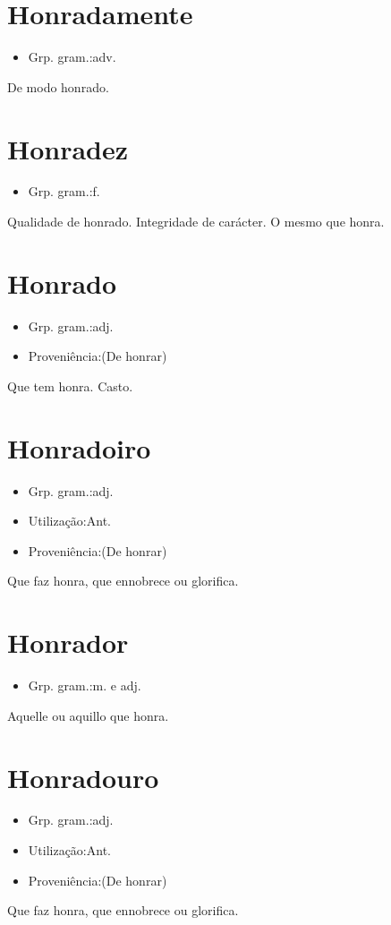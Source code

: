 \documentclass{article}
\begin{document}
\section{Honradamente}
\begin{itemize}
\item {Grp. gram.:adv.}
\end{itemize}
De modo honrado.
\section{Honradez}
\begin{itemize}
\item {Grp. gram.:f.}
\end{itemize}
Qualidade de honrado.
Integridade de carácter.
O mesmo que \textunderscore honra\textunderscore .
\section{Honrado}
\begin{itemize}
\item {Grp. gram.:adj.}
\end{itemize}
\begin{itemize}
\item {Proveniência:(De \textunderscore honrar\textunderscore )}
\end{itemize}
Que tem honra.
Casto.
\section{Honradoiro}
\begin{itemize}
\item {Grp. gram.:adj.}
\end{itemize}
\begin{itemize}
\item {Utilização:Ant.}
\end{itemize}
\begin{itemize}
\item {Proveniência:(De \textunderscore honrar\textunderscore )}
\end{itemize}
Que faz honra, que ennobrece ou glorifica.
\section{Honrador}
\begin{itemize}
\item {Grp. gram.:m.  e  adj.}
\end{itemize}
Aquelle ou aquillo que honra.
\section{Honradouro}
\begin{itemize}
\item {Grp. gram.:adj.}
\end{itemize}
\begin{itemize}
\item {Utilização:Ant.}
\end{itemize}
\begin{itemize}
\item {Proveniência:(De \textunderscore honrar\textunderscore )}
\end{itemize}
Que faz honra, que ennobrece ou glorifica.
\end{document}
